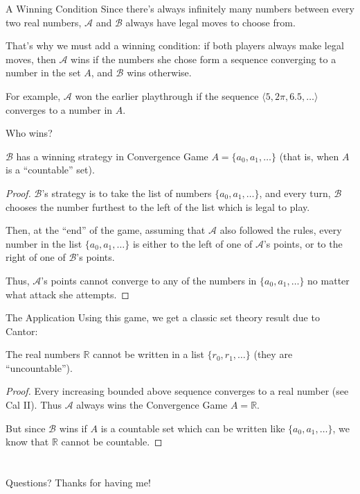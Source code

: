 \documentclass{beamer}
\theoremstyle{theorem}
\theoremstyle{definition}
\newcommand{\<}{\langle}
\renewcommand{\>}{\rangle}
\newcommand{\pl}[1]{\mathscr{#1}}
\newcommand{\vpause}{\pause\vspace{1em}}
\begin{document}
\begin{frame}{A Winning Condition}
  Since there's always infinitely many numbers between every
  two real numbers, $\pl A$ and $\pl B$ always have legal moves to choose from.

  \vpause

  That's why we must add a winning condition: if both players always make legal
  moves, then $\pl A$ wins if the numbers she chose form a sequence converging
  to a number in the set $A$, and $\pl B$ wins otherwise.

  \vpause

  For example, $\pl A$ won the earlier playthrough if the sequence
  $\<5,2\pi,6.5,\dots\>$ converges to a number in $A$.
\end{frame}

\begin{frame}{Who wins?}
  \begin{theorem}
    $\pl B$ has a winning strategy in Convergence Game $A=\{a_0,a_1,\dots\}$
    (that is, when $A$ is a ``countable'' set).
  \end{theorem}
\end{frame}

\begin{frame}
  \begin{proof}
    $\pl B$'s strategy is to take the list of numbers $\{a_0,a_1,\dots\}$,
    and every turn, $\pl B$ chooses the number furthest to the left of the list
    which is legal to play.

    \vpause

    Then, at the ``end'' of the game, assuming that $\pl A$ also followed the
    rules, every number in the list $\{a_0,a_1,\dots\}$ is either to the left
    of one of $\pl A$'s points, or to the right of one of $\pl B$'s points.

    \vpause

    Thus, $\pl A$'s points cannot converge to any of the numbers in
    $\{a_0,a_1,\dots\}$ no matter what attack she attempts.
  \end{proof}
\end{frame}

\begin{frame}{The Application}
  Using this game, we get a classic set theory result due to Cantor:

  \vpause

  \begin{theorem}
    The real numbers $\mathbb{R}$ cannot be written in a list
    $\{r_0,r_1,\dots\}$ (they are ``uncountable'').
  \end{theorem}

  \begin{proof}
    Every increasing bounded above sequence converges to a real number
    (see Cal II). Thus $\pl A$ always wins the Convergence Game $A=\mathbb{R}$.

    But since $\pl B$ wins if $A$ is a countable set which can be written like
    $\{a_0,a_1,\dots\}$, we know that $\mathbb{R}$ cannot be countable.
  \end{proof}
\end{frame}

\section*{}

\begin{frame}
Questions? Thanks for having me!
\end{frame}
\end{document}
